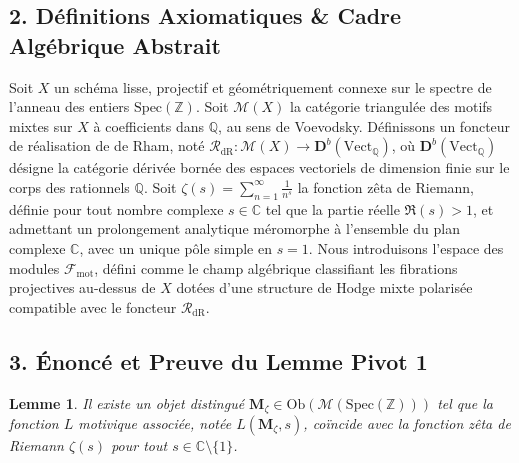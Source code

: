 \documentclass[
]{article}
\newtheorem{lemma}{Lemme}
\begin{document}
\hypertarget{duxe9finitions-axiomatiques-cadre-alguxe9brique-abstrait}{%
\subsection{2. Définitions Axiomatiques \& Cadre Algébrique
Abstrait}\label{duxe9finitions-axiomatiques-cadre-alguxe9brique-abstrait}}

Soit \(X\) un schéma lisse, projectif et géométriquement connexe sur le
spectre de l'anneau des entiers \(\mathrm{Spec}(\mathbb{Z})\). Soit
\(\mathcal{M}(X)\) la catégorie triangulée des motifs mixtes sur \(X\) à
coefficients dans \(\mathbb{Q}\), au sens de Voevodsky. Définissons un
foncteur de réalisation de de Rham, noté
\(\mathcal{R}_{\mathrm{dR}} : \mathcal{M}(X) \rightarrow \mathbf{D}^b(\mathrm{Vect}_{\mathbb{Q}})\),
où \(\mathbf{D}^b(\mathrm{Vect}_{\mathbb{Q}})\) désigne la catégorie
dérivée bornée des espaces vectoriels de dimension finie sur le corps
des rationnels \(\mathbb{Q}\). Soit
\(\zeta(s) = \sum_{n=1}^{\infty} \frac{1}{n^s}\) la fonction zêta de
Riemann, définie pour tout nombre complexe \(s \in \mathbb{C}\) tel que
la partie réelle \(\Re(s) > 1\), et admettant un prolongement analytique
méromorphe à l'ensemble du plan complexe \(\mathbb{C}\), avec un unique
pôle simple en \(s=1\). Nous introduisons l'espace des modules
\(\mathcal{F}_{\mathrm{mot}}\), défini comme le champ algébrique
classifiant les fibrations projectives au-dessus de \(X\) dotées d'une
structure de Hodge mixte polarisée compatible avec le foncteur
\(\mathcal{R}_{\mathrm{dR}}\).

\hypertarget{uxe9noncuxe9-et-preuve-du-lemme-pivot-1}{%
\subsection{3. Énoncé et Preuve du Lemme Pivot
1}\label{uxe9noncuxe9-et-preuve-du-lemme-pivot-1}}

\begin{lemma}
Il existe un objet distingué
\(\mathbf{M}_{\zeta} \in \mathrm{Ob}(\mathcal{M}(\mathrm{Spec}(\mathbb{Z})))\)
tel que la fonction \(L\) motivique associée, notée
\(L(\mathbf{M}_{\zeta}, s)\), coïncide avec la fonction zêta de Riemann
\(\zeta(s)\) pour tout \(s \in \mathbb{C} \setminus \{1\}\).
\end{lemma}
\end{document}
